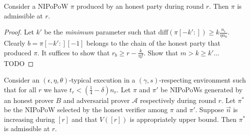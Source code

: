 \begin{lemma}\label{lem:honest-chop}
  Consider a NIPoPoW $\pi$ produced by an honest party during round $r$.
  Then $\pi$ is admissible at $r$.
\end{lemma}
\begin{proof}
  Let $k'$
  be the \emph{minimum} parameter such that
  $\text{diff}(\pi[-k':]) \geq k \frac{n_r}{\eta n_0}$.
  Clearly $b = \pi[-k':][-1]$ belongs to the chain of the honest party that
  produced $\pi$. It suffices to show that $r_b \geq r - \frac{k}{\eta f}$.
  Show that $m > k \geq k'$... TODO
\end{proof}

\begin{theorem}\label{thm:admissibility}
  Consider an $(\epsilon, \eta, \theta)$-typical execution in a
  $(\gamma, s)$-respecting environment such that for all $r$ we have
  $t_r < (\frac{1}{4} - \delta)n_r$.
  Let $\pi$ and $\pi'$ be NIPoPoWs generated by an honest prover $B$
  and adversarial prover $\mathcal{A}$ respectively during round $r$. Let
  $\pi^*$ be the NIPoPoW selected by the honest verifier among $\pi$
  and $\pi'$. Suppose $\vec{n}$ is increasing during $[r]$ and
  that $V([r])$ is appropriately upper bound.
  Then $\pi^*$ is admissible at $r$.
\end{theorem}
